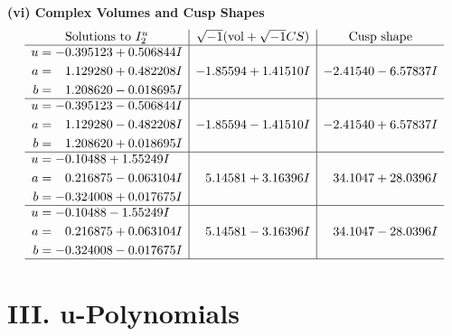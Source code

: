 \documentclass[1p]{elsarticle_modified}
\theoremstyle{definition}
\newcommand{\I}{\sqrt{-1}}
\begin{document}
\newpage\flushleft \textbf{(vi) Complex Volumes and Cusp Shapes}
$$\begin{array}{c|c|c}  
\text{Solutions to }I^u_{2}& \I (\text{vol} + \sqrt{-1}CS) & \text{Cusp shape}\\
 \hline 
\begin{aligned}
u &= -0.395123 + 0.506844 I \\
a &= \phantom{-}1.129280 + 0.482208 I \\
b &= \phantom{-}1.208620 - 0.018695 I\end{aligned}
 & -1.85594 + 1.41510 I & -2.41540 - 6.57837 I \\ \hline\begin{aligned}
u &= -0.395123 - 0.506844 I \\
a &= \phantom{-}1.129280 - 0.482208 I \\
b &= \phantom{-}1.208620 + 0.018695 I\end{aligned}
 & -1.85594 - 1.41510 I & -2.41540 + 6.57837 I \\ \hline\begin{aligned}
u &= -0.10488 + 1.55249 I \\
a &= \phantom{-}0.216875 - 0.063104 I \\
b &= -0.324008 + 0.017675 I\end{aligned}
 & \phantom{-}5.14581 + 3.16396 I & \phantom{-}34.1047 + 28.0396 I \\ \hline\begin{aligned}
u &= -0.10488 - 1.55249 I \\
a &= \phantom{-}0.216875 + 0.063104 I \\
b &= -0.324008 - 0.017675 I\end{aligned}
 & \phantom{-}5.14581 - 3.16396 I & \phantom{-}34.1047 - 28.0396 I\\
 \hline 
 \end{array}$$\newpage
\newpage\renewcommand{\arraystretch}{1}
\centering \section*{ III. u-Polynomials}
\end{document}
